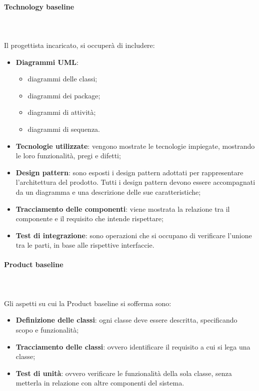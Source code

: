 			\paragraph{Technology baseline} \mbox{} \\ \mbox{} \\
			Il progettista incaricato, si occuperà di includere:
			\begin{itemize}
				\item \textbf{Diagrammi UML}:
				\begin{itemize}
					\item diagrammi delle classi;
					\item diagrammi dei package;
					\item diagrammi di attività;
					\item diagrammi di sequenza.
				\end{itemize}
				\item \textbf{Tecnologie utilizzate}: vengono mostrate le tecnologie impiegate, mostrando le loro funzionalità, pregi e difetti;
				\item \textbf{Design pattern}\glo : sono esposti i design pattern adottati per rappresentare l'architettura del prodotto. Tutti i design pattern devono essere accompagnati da un diagramma e una descrizione delle sue caratteristiche;
				\item \textbf{Tracciamento delle componenti}: viene mostrata la relazione tra il componente e il requisito che intende rispettare; 
				\item \textbf{Test di integrazione}: sono operazioni che si occupano di verificare l'unione tra le parti, in base alle rispettive interfaccie.
			\end{itemize}
			\paragraph{Product baseline} \mbox{} \\ \mbox{} \\
			Gli aspetti su cui la  Product baseline si sofferma sono:
				\begin{itemize}
					\item \textbf{Definizione delle classi}: ogni classe deve essere descritta, specificando scopo e funzionalità;
					\item \textbf{Tracciamento delle classi}: ovvero identificare il requisito a cui si lega una classe;
					\item \textbf{Test di unità}: ovvero verificare le funzionalità della sola classe, senza metterla in relazione con altre componenti del sistema.
				\end{itemize}
